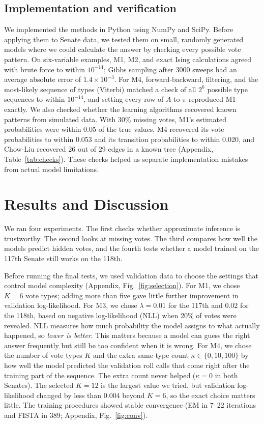 \documentclass[10pt]{article}
\begin{document}
\subsection{Implementation and verification}
We implemented the methods in Python using NumPy and SciPy. Before applying them to Senate data, we tested them on small, randomly generated models where we could calculate the answer by checking every possible vote pattern. On six-variable examples, M1, M2, and exact Ising calculations agreed with brute force to within $10^{-14}$; Gibbs sampling after 3000 sweeps had an average absolute error of $1.4\times10^{-3}$. For M4, forward-backward, filtering, and the most-likely sequence of types (Viterbi) matched a check of all $2^6$ possible type sequences to within $10^{-14}$, and setting every row of $A$ to $\pi$ reproduced M1 exactly. We also checked whether the learning algorithms recovered known patterns from simulated data. With 30\% missing votes, M1's estimated probabilities were within 0.05 of the true values, M4 recovered its vote probabilities to within 0.053 and its transition probabilities to within 0.020, and Chow-Liu recovered 26 out of 29 edges in a known tree (Appendix, Table~\ref{tab:checks}). These checks helped us separate implementation mistakes from actual model limitations.

\section{Results and Discussion}
We ran four experiments. The first checks whether approximate inference is trustworthy. The second looks at missing votes. The third compares how well the models predict hidden votes, and the fourth tests whether a model trained on the 117th Senate still works on the 118th. 

Before running the final tests, we used validation data to choose the settings that control model complexity (Appendix, Fig.~\ref{fig:selection}). For M1, we chose $K=6$ vote types; adding more than five gave little further improvement in validation log-likelihood. For M3, we chose $\lambda=0.01$ for the 117th and $0.02$ for the 118th, based on negative log-likelihood (NLL) when 20\% of votes were revealed. NLL measures how much probability the model assigns to what actually happened, so \emph{lower is better}. This matters because a model can guess the right answer frequently but still be too confident when it is wrong. For M4, we chose the number of vote types $K$ and the extra same-type count $\kappa\in\{0,10,100\}$ by how well the model predicted the validation roll calls that come right after the training part of the sequence. The extra count never helped ($\kappa=0$ in both Senates). The selected $K=12$ is the largest value we tried, but validation log-likelihood changed by less than 0.004 beyond $K=6$, so the exact choice matters little. The training procedures showed stable convergence (EM in 7--22 iterations and FISTA in 389; Appendix, Fig.~\ref{fig:conv}).
\end{document}
